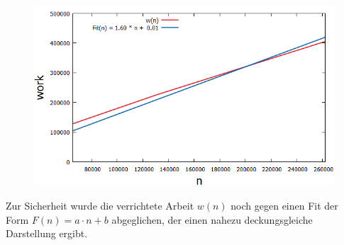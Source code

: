 \begin{figure}[H]
\begin{minipage}[t]{.30\textwidth}
    \end{minipage}
    \hspace*{1.2cm}
    \begin{minipage}[t]{.30\textwidth}
        \centering
        \includegraphics[width=1.25\textwidth]{pictures/med_algo_theo29_fit_work.png}
    \end{minipage}
    \vspace*{-0.1cm}
    \label{fig: med_theo29_rem}
\end{figure}

\noindent
Zur Sicherheit wurde die verrichtete Arbeit $w(n)$ noch gegen einen Fit der Form $F(n)= a\cdot n + b$ abgeglichen, der einen nahezu deckungsgleiche Darstellung ergibt.


\noindent